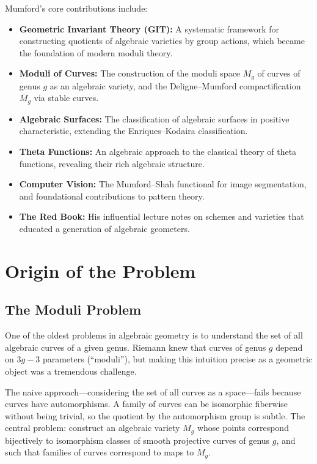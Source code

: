 Mumford's core contributions include:
\begin{itemize}
    \item \textbf{Geometric Invariant Theory (GIT):} A systematic framework for constructing quotients of algebraic varieties by group actions, which became the foundation of modern moduli theory.
    \item \textbf{Moduli of Curves:} The construction of the moduli space $M_g$ of curves of genus $g$ as an algebraic variety, and the Deligne--Mumford compactification $\overline{M}_g$ via stable curves.
    \item \textbf{Algebraic Surfaces:} The classification of algebraic surfaces in positive characteristic, extending the Enriques--Kodaira classification.
    \item \textbf{Theta Functions:} An algebraic approach to the classical theory of theta functions, revealing their rich algebraic structure.
    \item \textbf{Computer Vision:} The Mumford--Shah functional for image segmentation, and foundational contributions to pattern theory.
    \item \textbf{The Red Book:} His influential lecture notes on schemes and varieties that educated a generation of algebraic geometers.
\end{itemize}

\section{Origin of the Problem}

\subsection{The Moduli Problem}

One of the oldest problems in algebraic geometry is to understand the set of all algebraic curves of a given genus. Riemann knew that curves of genus $g$ depend on $3g-3$ parameters (``moduli''), but making this intuition precise as a geometric object was a tremendous challenge.

The naive approach---considering the set of all curves as a space---fails because curves have automorphisms. A family of curves can be isomorphic fiberwise without being trivial, so the quotient by the automorphism group is subtle. The central problem: construct an algebraic variety $M_g$ whose points correspond bijectively to isomorphism classes of smooth projective curves of genus $g$, and such that families of curves correspond to maps to $M_g$.

